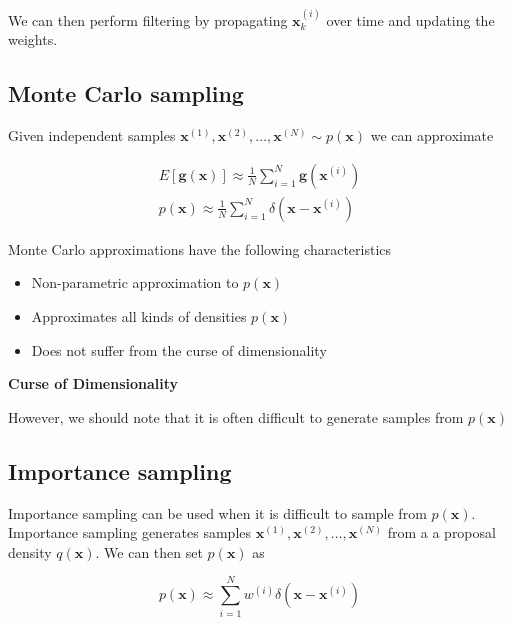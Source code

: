 We can then perform filtering by propagating $\mathbf{x}_{k}^{(i)}$ over time and
updating the weights.


\subsection{Monte Carlo sampling}
\label{monte_carlo_sampling}

Given independent samples $\mathbf{x}^{(1)}, \mathbf{x}^{(2)}, \ldots, \mathbf{x}^{(N)} \sim p(\mathbf{x})$ we can approximate

\begin{eqnarray}
E[\mathbf{g}(\mathbf{x})] \approx \frac{1}{N}\sum_{i=1}^N \mathbf{g}(\mathbf{x}^{(i)}) \\
p(\mathbf{x}) \approx \frac{1}{N}\sum_{i=1}^N \delta(\mathbf{x} - \mathbf{x}^{(i)})
\end{eqnarray}

Monte Carlo approximations have the following characteristics

\begin{itemize}
\item Non-parametric approximation to $p(\mathbf{x})$
\item Approximates all kinds of densities $p(\mathbf{x})$
\item Does not suffer from the curse of dimensionality
\end{itemize}

\begin{framed}
\theoremstyle{remark}
\begin{remark}{\textbf{Curse of Dimensionality}}

\end{remark}
\end{framed}

However, we should note that it is often difficult to generate samples from $p(\mathbf{x})$

\subsection{Importance sampling}
\label{importance_sampling}

Importance sampling can be used when it is difficult to sample from $p(\mathbf{x})$. Importance sampling generates samples
$\mathbf{x}^{(1)}, \mathbf{x}^{(2)}, \ldots, \mathbf{x}^{(N)}$ from a a proposal density $q(\mathbf{x})$. We can then set $p(\mathbf{x})$ as

\begin{equation}
p(\mathbf{x}) \approx \sum_{i=1}^N w^{(i)} \delta (\mathbf{x} -\mathbf{x}^{(i)})
\end{equation} 

